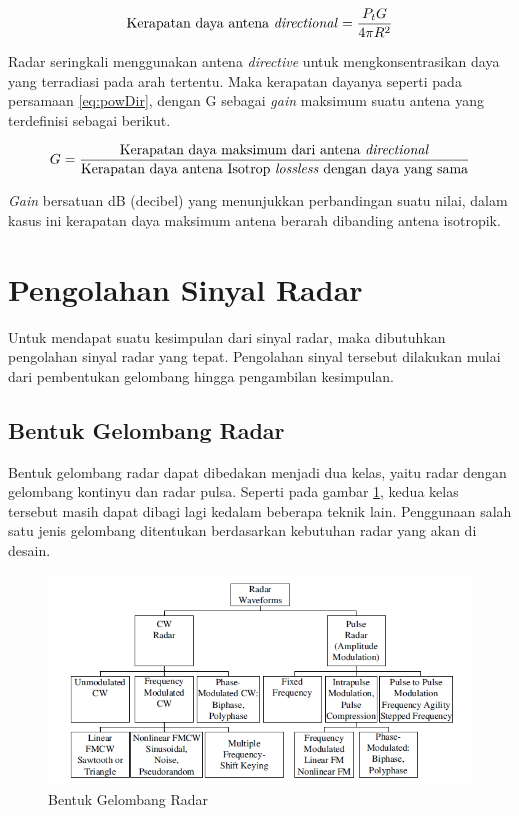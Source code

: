 \begin{equation}
	\text{Kerapatan daya antena \textit{directional}} = \frac{P_{t} G}{4\pi R^{2}}
	\label{eq:powDir}
\end{equation}

Radar seringkali menggunakan antena \textit{directive} untuk mengkonsentrasikan daya yang terradiasi pada arah tertentu. Maka kerapatan dayanya seperti pada persamaan \ref{eq:powDir}, dengan G sebagai \textit{gain} maksimum suatu antena yang terdefinisi sebagai berikut.

\begin{equation}
	G  = \frac{\text{Kerapatan daya maksimum dari antena \textit{directional}}}{\text{Kerapatan daya antena Isotrop \textit{lossless} dengan daya yang sama}}
\end{equation}

\textit{Gain} bersatuan dB (decibel) yang menunjukkan perbandingan suatu nilai, dalam kasus ini kerapatan daya maksimum antena berarah dibanding antena isotropik.

\section{Pengolahan Sinyal Radar}
Untuk mendapat suatu kesimpulan dari sinyal radar, maka dibutuhkan pengolahan sinyal radar yang tepat. Pengolahan sinyal tersebut dilakukan mulai dari pembentukan gelombang hingga pengambilan kesimpulan. 

\subsection{Bentuk Gelombang Radar}

Bentuk gelombang radar dapat dibedakan menjadi dua kelas, yaitu radar dengan gelombang kontinyu dan radar pulsa. Seperti pada gambar \ref{pic:bentukgelradar}, kedua kelas tersebut masih dapat dibagi lagi kedalam beberapa teknik lain. Penggunaan salah satu jenis gelombang ditentukan berdasarkan kebutuhan radar yang akan di desain. 

\begin{figure}
	\begin{center}
		\includegraphics[scale=0.8]{pics/bab2/radarwaveform.png}
		\caption[Bentuk Gelombang Radar]{Bentuk Gelombang Radar \cite{Melvin2014}}
		\label{pic:bentukgelradar}
	\end{center}
\end{figure}


